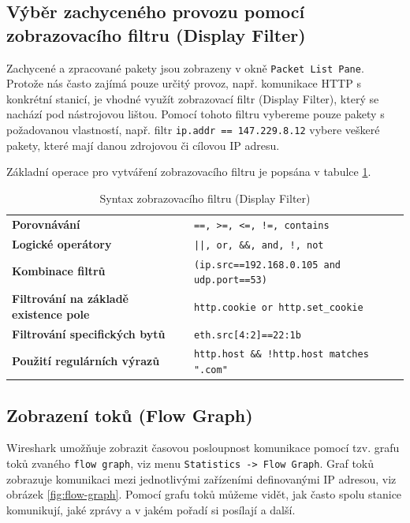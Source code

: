 \subsection{Výběr zachyceného provozu pomocí zobrazovacího filtru (Display Filter)}
Zachycené a zpracované pakety jsou zobrazeny v okně {\tt Packet List Pane}. Protože nás často zajímá pouze určitý provoz, např. komunikace HTTP s konkrétní stanicí, je vhodné využít zobrazovací filtr (Display Filter), který se nachází pod nástrojovou lištou. Pomocí tohoto filtru vybereme pouze pakety s požadovanou vlastností, např. filtr {\tt ip.addr == 147.229.8.12} vybere veškeré pakety, které mají danou zdrojovou či cílovou IP adresu. 

Základní operace pro vytváření zobrazovacího filtru je popsána v tabulce \ref{tab:display-filter}. 
\begin{center}
  \begin{table}[h]
    \centering
    \def\arraystretch{1.2}
    \begin{tabular}{|l|l|}
      \hline
      \textbf{Porovnávání} & \texttt{==, >=, <=, !=, contains}\\
      \textbf{Logické operátory} & \texttt{||, or, \&\&, and, !, not}\\
      \textbf{Kombinace filtrů} & \texttt{(ip.src==192.168.0.105 and udp.port==53)}\\
      \textbf{Filtrování na základě existence pole} & \texttt{http.cookie or http.set\_cookie}\\
      \textbf{Filtrování specifických bytů} & \texttt{eth.src[4:2]==22:1b}\\
      \textbf{Použití regulárních výrazů} & \texttt{http.host \&\& !http.host matches ".com"}\\
      \hline
    \end{tabular}
    \caption{Syntax zobrazovacího filtru (Display Filter)}\label{tab:display-filter}
  \end{table}
\end{center}

\subsection{Zobrazení toků (Flow Graph)}
Wireshark umožňuje zobrazit časovou posloupnost komunikace pomocí tzv. grafu toků zvaného \texttt{flow graph}, viz menu \texttt{Statistics -> Flow Graph}. Graf toků zobrazuje komunikaci mezi jednotlivými zařízeními definovanými IP adresou, viz obrázek \ref{fig:flow-graph}. Pomocí grafu toků můžeme vidět, jak často spolu stanice komunikují, jaké zprávy a v jakém pořadí si posílají a další.

